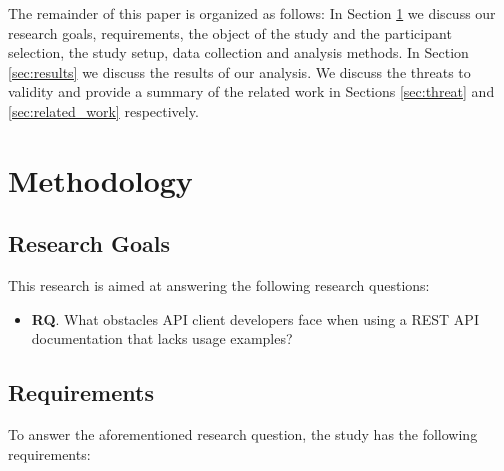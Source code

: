 \documentclass[conference]{IEEEtran}
\begin{document}
The remainder of this paper is organized as follows: In Section \ref{sec:method} we discuss our research goals, requirements, the object of the study and the participant selection, the study setup, data collection and analysis methods. In Section \ref{sec:results} we discuss the results of our analysis. We discuss the threats to validity and provide a summary of the related work in Sections \ref{sec:threat} and  \ref{sec:related_work} respectively.

\section{Methodology}
\label{sec:method}
\subsection{Research Goals}
This research is aimed at answering the following research questions:

\begin{itemize}
  \item \textbf{RQ}. What obstacles API client developers face when using a REST API documentation that lacks usage examples?
\end{itemize}

\subsection{Requirements} %

To answer the aforementioned research question, the study has the following requirements:
\end{document}
